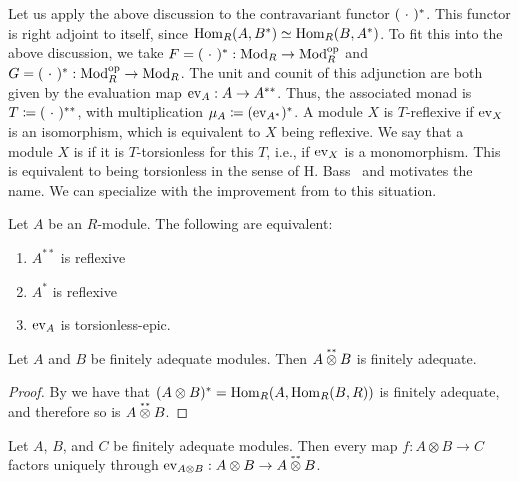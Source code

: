 Let us apply the above discussion to the contravariant functor $(\ \cdot\ )^\ast$.
This functor is right adjoint to itself, since $\mathrm{Hom}_R(A, B^\ast) \simeq \mathrm{Hom}_R(B,A^\ast)$.
To fit this into the above discussion, we take $F = (\ \cdot\ )^\ast : \textup{Mod}_{R} \to \textup{Mod}_{R}^{\textup{op}}$
and $G = (\ \cdot\ )^\ast : \textup{Mod}_{R}^{\textup{op}} \to \textup{Mod}_{R}$.
The unit and counit of this adjunction are both given by the evaluation map $\mathrm{ev}_A : A \to A^{\ast\ast}$.
Thus, the associated monad is $T \coloneq (\ \cdot\ )^{\ast\ast}$, with multiplication $\mu_A \coloneq (\mathrm{ev}_{A^\ast})^\ast$.
A module $X$ is $T$-reflexive if $\mathrm{ev}_X$ is an isomorphism, which is equivalent to $X$ being reflexive.
We say that a module $X$ is  if it is $T$-torsionless for this $T$,
i.e., if $\mathrm{ev}_X$ is a monomorphism.
This is equivalent to being torsionless in the sense of H. Bass~\cite{bass1960} and motivates the name.
We can specialize  with the improvement from  to this situation.

\begin{corollary}\label{cor:dbl-dual-reflexive-iss-dual-reflexive}
  Let $A$ be an $R$-module. The following are equivalent:
  \begin{enumerate}[noitemsep]
    \item $A^{\ast\ast}$ is reflexive
    \item $A^\ast$ is reflexive
    \item $\mathrm{ev}_A$ is torsionless-epic. \earlyqed
  \end{enumerate}
\end{corollary}

\begin{lemma}\label{double-dual-tensor-finitely-adequate}
Let $A$ and $B$ be finitely adequate modules. Then $A \dbldualtensor B$ is finitely adequate.
\end{lemma}

\begin{proof}
By  we have that $(A \otimes B)^\ast = \mathrm{Hom}_R(A,\mathrm{Hom}_R(B,R))$ is finitely adequate, and therefore so is $A \dbldualtensor B$.
\end{proof}

\begin{proposition}\label{prp:dbl-dual-tensor-factorization}
  Let $A$, $B$, and $C$ be finitely adequate modules. Then every map $f : A \otimes B \to C$ factors uniquely through $\ev_{A \otimes B} : A \otimes B \to A \dbldualtensor B$.
\end{proposition}

